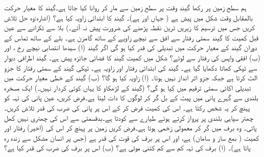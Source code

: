 ہم سطح زمین پر  رکھا گیند   وقت  پر  سطح  زمین سے مار کر  روانا کیا جاتا ہے۔گیند کا معیار حرکت  بالمقابل وقت  شکل  میں پیش ہے ( جہاں  اور  ہے)۔ گیند کا ابتدائی زاویہ کیا ہے؟ (اشارہ:وہ حل تلاش کریں جس میں ترسیم کا زیریں ترین نقطہ پڑھنے کی ضرورت پیش نہ آئے۔)
بلا سے ٹکرانے سے عین قبل   کمیت  کا گیند  سمتی رفتار سے افق سے نیچے  زاویے کے ساتھ گامزن ہے۔ بلے کے ساتھ تماس کے دوران گیند کے معیار حرکت میں تبدیلی کی قدر  کیا ہو گی   اگر  گیند (ا) سیدھا انتصابی  نیچے  رخ ، اور (ب) افقی واپس  کی رفتار سے لوٹے؟
شکل  میں    کمیت  گیند  کا   فضائی جائزہ پیش ہے۔ گیند  اطرافی  دیوار  سے  ٹپکی کھاتا   دکھایا گیا ہے۔ گیند کی ابتدائی رفتار  اور زاویہ  ہے۔ ٹپکی گیند  کے سمتی رفتار کا  جزو الٹ کرتا ہے جبکہ  جزو اثر انداز نہیں ہوتا۔ (ا) زاویہ  کیا ہو گا؟ (ب) گیند کے خطی معیار حرکت میں تبدیلی اکائی سمتی ترقیم میں کیا ہو گی؟ (گیند کے   لڑھکاو  کا یہاں کوئی کردار نہیں۔)
ایک مسخرہ  بلندی سے  گہرے پانی میں  پیٹ کے بل گر کر لوگوں کا دات لیتا ہے۔فرض کریں، عین  پانی کی تہہ کو پہنچ کر یہ شخص   رکتا ہے۔ اس کی کمیت فرض کر کے اس پر پانی کی  ضرب کی قدر تلاش کریں۔
 چھتر سپاہی   بلندی  پر پرواز کرتے  ہوئے طیارے سے کودتا ہے۔بدقسمتی سے اس کی چھتری نہیں کھل پاتی۔ وہ برف میں گر کر معمولی زخمی ہوتا ہے۔فرض کریں زمین پر پہنچ کر  اس کی (اخیر) رفتار   اور   کمیت  ( بمع ساز و سامان)  ہے، اور  اس پر برف کی قوت کی قدر  ہے (جس پر انسان مشکل سے زندہ رہ پاتا ہے)۔ (ا) برف کی تہہ کم سے کم کتنی موٹی ہے؟ (ب)  اس پر برف کی ضرب کی قدر کیا ہے؟
